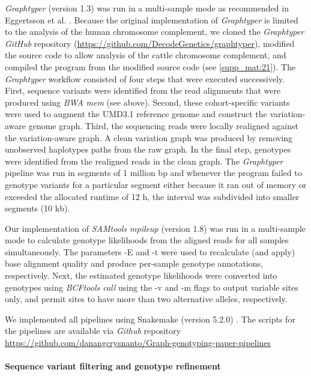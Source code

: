 \documentclass[../main.tex]{subfiles}
\begin{document}
\emph{Graphtyper} (version 1.3) was run in a multi-sample mode as recommended in Eggertsson et al. \citep{eggertsson2017graphtyper}. Because the original implementation of \emph{Graphtyper} is limited to the analysis of the human chromosome complement, we cloned the \emph{Graphtyper GitHub} repository (\url{https://github.com/DecodeGenetics/graphtyper}), modified the source code to allow analysis of the cattle chromosome complement, and compiled the program from the modified source code (see \ref{supp_mat:21}). The \emph{Graphtyper} workflow consisted of four steps that were executed successively. First, sequence variants were identified from the read alignments that were produced using \emph{BWA mem} (see above). Second, these cohort-specific variants were used to augment the UMD3.1 reference genome and construct the variation-aware genome graph. Third, the sequencing reads were locally realigned against the variation-aware graph. A clean variation graph was produced by removing unobserved haplotypes paths from the raw graph. In the final step, genotypes were identified from the realigned reads in the clean graph. The  \emph{Graphtyper} pipeline was run in segments of 1 million bp and whenever the program failed to genotype variants for a particular segment either because it ran out of memory or exceeded the allocated runtime of 12 h, the interval was subdivided into smaller segments (10 kb).

Our implementation of \emph{SAMtools mpileup} (version 1.8) \citep{li2011statistical} was run in a multi-sample mode to calculate genotype likelihoods from the aligned reads for all samples simultaneously. The parameters -E and -t were used to recalculate (and apply) base alignment quality and produce per-sample genotype annotations, respectively. Next, the estimated genotype likelihoods were converted into genotypes using \emph{BCFtools call} using the -v and -m flags to output variable sites only, and permit sites to have more than two alternative alleles, respectively.

We implemented all pipelines using Snakemake (version 5.2.0) \citep{koster2012snakemake}. The scripts for the pipelines are available via \emph{Github} repository \\
\url{https://github.com/danangcrysnanto/Graph-genotyping-paper-pipelines}

\paragraph{Sequence variant filtering and genotype refinement}
\end{document}
